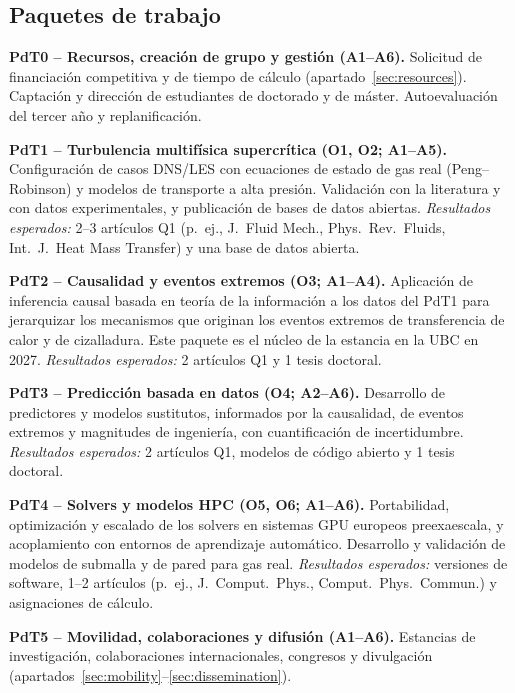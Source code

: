 \documentclass[11pt]{article}
\begin{document}
\subsection{Paquetes de trabajo}
\textbf{PdT0 -- Recursos, creación de grupo y gestión (A1--A6).}
Solicitud de financiación competitiva y de tiempo de cálculo
(apartado~\ref{sec:resources}). Captación y dirección de estudiantes de doctorado y de
máster. Autoevaluación del tercer año y replanificación.

\textbf{PdT1 -- Turbulencia multifísica supercrítica (O1, O2; A1--A5).}
Configuración de casos DNS/LES con ecuaciones de estado de gas real (Peng--Robinson) y
modelos de transporte a alta presión. Validación con la literatura y con datos
experimentales, y publicación de bases de datos abiertas. \emph{Resultados esperados:} 2--3
artículos Q1 (p.~ej., J.\ Fluid Mech., Phys.\ Rev.\ Fluids, Int.\ J.\ Heat Mass Transfer)
y una base de datos abierta.

\textbf{PdT2 -- Causalidad y eventos extremos (O3; A1--A4).}
Aplicación de inferencia causal basada en teoría de la información a los datos del PdT1
para jerarquizar los mecanismos que originan los eventos extremos de transferencia de calor y
de cizalladura. Este paquete es el núcleo de la estancia en la UBC en 2027.
\emph{Resultados esperados:} 2 artículos Q1 y 1 tesis doctoral.

\textbf{PdT3 -- Predicción basada en datos (O4; A2--A6).}
Desarrollo de predictores y modelos sustitutos, informados por la causalidad, de eventos
extremos y magnitudes de ingeniería, con cuantificación de incertidumbre.
\emph{Resultados esperados:} 2 artículos Q1, modelos de código abierto y 1 tesis doctoral.

\textbf{PdT4 -- Solvers y modelos HPC (O5, O6; A1--A6).}
Portabilidad, optimización y escalado de los solvers en sistemas GPU europeos
preexaescala, y acoplamiento con entornos de aprendizaje automático. Desarrollo y
validación de modelos de submalla y de pared para gas real.
\emph{Resultados esperados:} versiones de software, 1--2 artículos (p.~ej., J.\ Comput.\
Phys., Comput.\ Phys.\ Commun.) y asignaciones de cálculo.

\textbf{PdT5 -- Movilidad, colaboraciones y difusión (A1--A6).}
Estancias de investigación, colaboraciones internacionales, congresos y divulgación
(apartados~\ref{sec:mobility}--\ref{sec:dissemination}).
\end{document}
